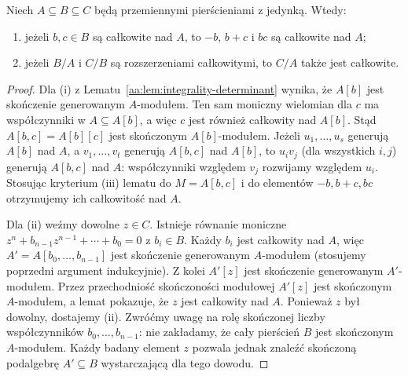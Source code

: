 \begin{twierdzenie}
\label{aa:tw:integrality-transitive}
Niech $A\subseteq B\subseteq C$ będą przemiennymi pierścieniami
z jedynką. Wtedy:
\begin{enumerate}[label=\textup{(\roman*)}]
\item jeżeli $b,c\in B$ są całkowite nad $A$, to
$-b$, $b+c$ i $bc$ są całkowite nad $A$;
\item jeżeli $B/A$ i $C/B$ są rozszerzeniami całkowitymi,
 to $C/A$ także jest całkowite.
\end{enumerate}
\end{twierdzenie}
\begin{proof}
Dla (i) z Lematu~\ref{aa:lem:integrality-determinant} wynika,
że $A[b]$ jest skończenie generowanym $A$-modułem.
Ten sam moniczny wielomian dla $c$ ma współczynniki w
$A\subseteq A[b]$, a więc $c$ jest również całkowity
nad $A[b]$. Stąd $A[b,c]=A[b][c]$ jest skończonym
$A[b]$-modułem. Jeżeli
$u_1,\ldots,u_s$ generują $A[b]$ nad $A$, a
$v_1,\ldots,v_t$ generują $A[b,c]$ nad $A[b]$, to
$u_iv_j$ (dla wszystkich $i,j$) generują $A[b,c]$ nad $A$:
współczynniki względem $v_j$ rozwijamy względem $u_i$.
Stosując kryterium (iii) lematu do
$M=A[b,c]$ i do elementów $-b,b+c,bc$ otrzymujemy
ich całkowitość nad $A$.

Dla (ii) weźmy dowolne $z\in C$. Istnieje równanie moniczne
$z^n+b_{n-1}z^{n-1}+\cdots+b_0=0$ z $b_i\in B$.
Każdy $b_i$ jest całkowity nad $A$, więc
$A'=A[b_0,\ldots,b_{n-1}]$ jest skończenie generowanym
$A$-modułem (stosujemy poprzedni argument indukcyjnie).
Z kolei $A'[z]$ jest skończenie generowanym $A'$-modułem.
Przez przechodniość skończoności modułowej $A'[z]$ jest
skończonym $A$-modułem, a lemat pokazuje, że $z$ jest
całkowity nad $A$. Ponieważ $z$ był dowolny, dostajemy (ii).
Zwróćmy uwagę na rolę skończonej liczby współczynników
$b_0,\ldots,b_{n-1}$: nie zakładamy, że cały pierścień
$B$ jest skończonym $A$-modułem. Każdy badany element
$z$ pozwala jednak znaleźć skończoną podalgebrę
$A'\subseteq B$ wystarczającą dla tego dowodu.
\end{proof}


